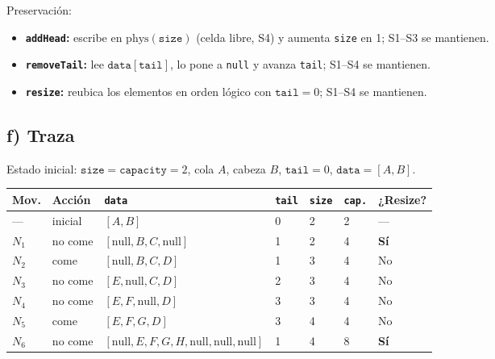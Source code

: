 \documentclass[11pt,a4paper]{article}
\begin{document}
Preservación:
\begin{itemize}[leftmargin=1.2cm]
    \item \textbf{\texttt{addHead}:} escribe en $\text{phys}(\texttt{size})$ (celda libre, S4) y aumenta \texttt{size} en 1; S1--S3 se mantienen.
    \item \textbf{\texttt{removeTail}:} lee $\texttt{data}[\texttt{tail}]$, lo pone a \texttt{null} y avanza \texttt{tail}; S1--S4 se mantienen.
    \item \textbf{\texttt{resize}:} reubica los elementos en orden lógico con $\texttt{tail} = 0$; S1--S4 se mantienen.
\end{itemize}

\subsection*{f) Traza}

Estado inicial: $\texttt{size} = \texttt{capacity} = 2$, cola $A$, cabeza $B$, $\texttt{tail} = 0$, $\texttt{data} = [A, B]$.

\renewcommand{\arraystretch}{1.3}
{\setlength{\tabcolsep}{4pt}
\begin{center}
\small
\begin{tabular}{@{}L{1cm}L{2cm}L{6cm}L{1cm}L{1cm}L{1.2cm}L{1.6cm}@{}}
\toprule
Mov. & Acción & \texttt{data} & \texttt{tail} & \texttt{size} & \texttt{cap.} & ¿Resize? \\
\midrule
--- & inicial &
$[A,B]$ &
0 & 2 & 2 & --- \\

$N_1$ & no come &
$[\text{null},B,C,\text{null}]$ &
1 & 2 & 4 & \textbf{Sí} \\

$N_2$ & come &
$[\text{null},B,C,D]$ &
1 & 3 & 4 & No \\

$N_3$ & no come &
$[E,\text{null},C,D]$ &
2 & 3 & 4 & No \\

$N_4$ & no come &
$[E,F,\text{null},D]$ &
3 & 3 & 4 & No \\

$N_5$ & come &
$[E,F,G,D]$ &
3 & 4 & 4 & No \\

$N_6$ & no come &
$[\text{null},E,F,G,H,\text{null},\text{null},\text{null}]$ &
1 & 4 & 8 & \textbf{Sí} \\

\bottomrule
\end{tabular}
\end{center}}
\renewcommand{\arraystretch}{1}
\end{document}
